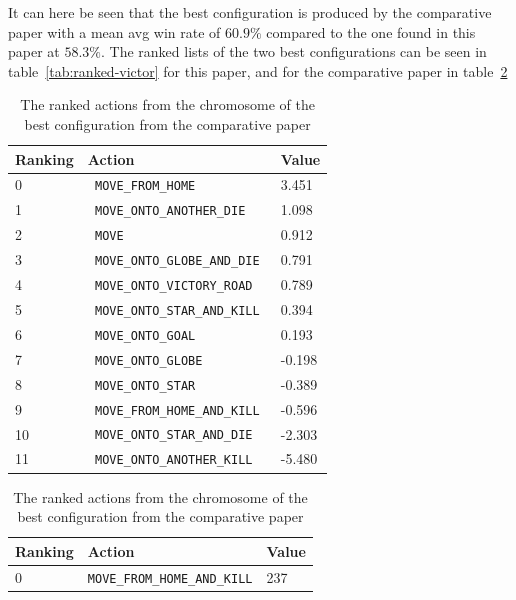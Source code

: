 It can here be seen that the best configuration is produced by the comparative paper
with a mean avg win rate of $60.9\%$ compared to the one found in this paper at $58.3\%$.
The ranked lists of the two best configurations can be seen in table~\ref{tab:ranked-victor}
for this paper, and for the comparative paper in table~\ref{tab:ranked-peter}
\begin{table}[!htb]
    \begin{minipage}[b]{.5\linewidth}
		\centering
		\caption{The ranked actions from the chromosome of C3 from this paper}
		\label{tab:ranked-victor}
        \begin{tabular}[t]{|l|l|l|} \hline
			Ranking & Action & Value \\ \hline
			0  & \texttt{            MOVE\_FROM\_HOME }&  3.451 \\
			1  & \texttt{    MOVE\_ONTO\_ANOTHER\_DIE }&  1.098 \\
			2  & \texttt{                        MOVE }&  0.912 \\
			3  & \texttt{ MOVE\_ONTO\_GLOBE\_AND\_DIE }&  0.791 \\
			4  & \texttt{   MOVE\_ONTO\_VICTORY\_ROAD }&  0.789 \\
			5  & \texttt{ MOVE\_ONTO\_STAR\_AND\_KILL }&  0.394 \\
			6  & \texttt{            MOVE\_ONTO\_GOAL }&  0.193 \\
			7  & \texttt{           MOVE\_ONTO\_GLOBE }& -0.198 \\
			8  & \texttt{            MOVE\_ONTO\_STAR }& -0.389 \\
			9  & \texttt{ MOVE\_FROM\_HOME\_AND\_KILL }& -0.596 \\
			10 & \texttt{  MOVE\_ONTO\_STAR\_AND\_DIE }& -2.303 \\
			11 & \texttt{   MOVE\_ONTO\_ANOTHER\_KILL }& -5.480 \\ \hline
        \end{tabular}
    \end{minipage}%
	\hspace{0.3cm}
	\begin{minipage}[b]{.5\linewidth}
      \centering
	  \caption{The ranked actions from the chromosome of the best configuration from the comparative paper}
	  \label{tab:ranked-peter}
	  	\begin{tabular}[t]{|l|l|l|}\hline
			Ranking & Action & Value \\ 
			\hline
			0  & \texttt{MOVE\_FROM\_HOME\_AND\_KILL}&   237 \\

\end{tabular}
\end{minipage}
\end{table}
